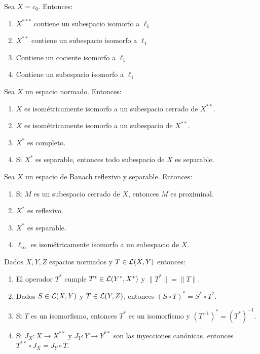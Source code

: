 \documentclass[12pt]{article}
\begin{document}
\begin{ejercicio}
    Sea $X=c_0$. Entonces:
    \begin{enumerate}[label={\arabic*)}]
        \item $X^{***}$ contiene un subespacio isomorfo a $\ell_1$
        \item $X^{**}$ contiene un subespacio isomorfo a $\ell_1$
        \item Contiene un cociente isomorfo a $\ell_1$
        \item Contiene un subespacio isomorfo a $\ell_1$
    \end{enumerate}
\end{ejercicio}

\begin{ejercicio}
    Sea $X$ un espacio normado. Entonces:
    \begin{enumerate}[label={\arabic*)}]
        \item $X$ es isométricamente isomorfo a un subespacio cerrado de $X^{**}$.
        \item $X$ es isométricamente isomorfo a un subespacio de $X^{**}$.
        \item $X^*$ es completo.
        \item Si $X^*$ es separable, entonces todo subespacio de $X$ es separable.
    \end{enumerate}
\end{ejercicio}

\begin{ejercicio}
    Sea $X$ un espacio de Banach reflexivo y separable. Entonces:
    \begin{enumerate}[label={\arabic*)}]
        \item Si $M$ es un subespacio cerrado de $X$, entonces $M$ es proximinal.
        \item $X^*$ es reflexivo.
        \item $X^*$ es separable.
        \item $\ell_\infty$ es isométricamente isomorfo a un subespacio de $X$.
    \end{enumerate}
\end{ejercicio}

\begin{ejercicio}
    Dados $X,Y,Z$ espacios normados y $T\in \mathcal{L}(X,Y)$ entonces:
    \begin{enumerate}[label={\arabic*)}]
        \item El operador $T^*$ cumple $T^* \in \mathcal{L}(Y^*,X^*)$ y $\|T^*\| = \|T\|$.
        \item Dados $S\in \mathcal{L}(X,Y)$ y $T\in \mathcal{L}(Y,Z)$, entonces $(S\circ T)^* = S^*\circ T^*$.
        \item Si $T$ es un isomorfismo, entonces $T^*$ es un isomorfismo y $(T^{-1})^* = (T^*)^{-1}$.
        \item Si $J_X\colon X\to X^{**}$ y $J_Y\colon Y\to Y^{**}$ son las inyecciones canónicas, entonces $T^{**}\circ J_X = J_Y\circ T$.
    \end{enumerate}
\end{ejercicio}
\end{document}
